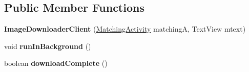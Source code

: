 \subsection*{Public Member Functions}
\begin{DoxyCompactItemize}
\item 
{\bfseries Image\+Downloader\+Client} (\hyperlink{classcom_1_1example_1_1sebastian_1_1tindertp_1_1MatchingActivity}{Matching\+Activity} matchingA, Text\+View mtext)\hypertarget{classcom_1_1example_1_1sebastian_1_1tindertp_1_1internetTools_1_1ImageDownloaderClient_ac8ca1a959cf1c820b81ecac2d01092d2}{}\label{classcom_1_1example_1_1sebastian_1_1tindertp_1_1internetTools_1_1ImageDownloaderClient_ac8ca1a959cf1c820b81ecac2d01092d2}

\item 
void {\bfseries run\+In\+Background} ()\hypertarget{classcom_1_1example_1_1sebastian_1_1tindertp_1_1internetTools_1_1ImageDownloaderClient_a2e711337c47bd788c2de219bb3c7d8e3}{}\label{classcom_1_1example_1_1sebastian_1_1tindertp_1_1internetTools_1_1ImageDownloaderClient_a2e711337c47bd788c2de219bb3c7d8e3}

\item 
boolean {\bfseries download\+Complete} ()\hypertarget{classcom_1_1example_1_1sebastian_1_1tindertp_1_1internetTools_1_1ImageDownloaderClient_add14b75c303bfb59a78033b52313efd0}{}\label{classcom_1_1example_1_1sebastian_1_1tindertp_1_1internetTools_1_1ImageDownloaderClient_add14b75c303bfb59a78033b52313efd0}

\end{DoxyCompactItemize}
